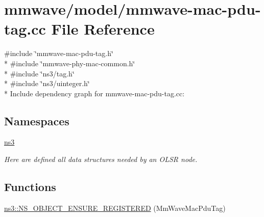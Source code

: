 \hypertarget{mmwave-mac-pdu-tag_8cc}{}\section{mmwave/model/mmwave-\/mac-\/pdu-\/tag.cc File Reference}
\label{mmwave-mac-pdu-tag_8cc}
{\ttfamily \#include \char`\"{}mmwave-\/mac-\/pdu-\/tag.\+h\char`\"{}}\\*
{\ttfamily \#include \char`\"{}mmwave-\/phy-\/mac-\/common.\+h\char`\"{}}\\*
{\ttfamily \#include \char`\"{}ns3/tag.\+h\char`\"{}}\\*
{\ttfamily \#include \char`\"{}ns3/uinteger.\+h\char`\"{}}\\*
Include dependency graph for mmwave-\/mac-\/pdu-\/tag.cc\+:
\subsection*{Namespaces}
\begin{DoxyCompactItemize}
\item 
 \hyperlink{namespacens3}{ns3}
\begin{DoxyCompactList}\small\item\em Here are defined all data structures needed by an O\+L\+SR node. \end{DoxyCompactList}\end{DoxyCompactItemize}
\subsection*{Functions}
\begin{DoxyCompactItemize}
\item 
\hyperlink{namespacens3_a17d75e36e3e523578fe1b33c8dce908f}{ns3\+::\+N\+S\+\_\+\+O\+B\+J\+E\+C\+T\+\_\+\+E\+N\+S\+U\+R\+E\+\_\+\+R\+E\+G\+I\+S\+T\+E\+R\+ED} (Mm\+Wave\+Mac\+Pdu\+Tag)
\end{DoxyCompactItemize}

